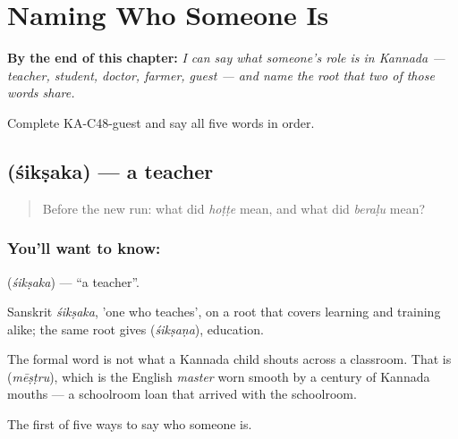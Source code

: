 
\chapter{Naming Who Someone Is}
\label{ch:ka-roles}

\begin{chapteropening}
\textbf{By the end of this chapter:} \emph{I can say what someone's role is in Kannada --- teacher, student, doctor, farmer, guest --- and name the root that two of those words share.}

Complete KA-C48-guest and say all five words in order.
\end{chapteropening}

\section[\texorpdfstring{\kn{ಶಿಕ್ಷಕ} (śikṣaka)}{ಶಿಕ್ಷಕ (śikṣaka)}]{ (śikṣaka) — a teacher}

\label{lesson:KA-C48-teacher}



\begin{quote}
Before the new run: what did \emph{hoṭṭe} mean, and what did \emph{beraḷu} mean?
\end{quote}

\subsection*{You'll want to know: }
\textbf{} (\emph{śikṣaka}) — \textquotedblleft{}a teacher\textquotedblright{}.

Sanskrit \emph{śikṣaka}, 'one who teaches', on a root that covers learning and training alike; the same root gives  (\emph{śikṣaṇa}), education.

The formal word is not what a Kannada child shouts across a classroom. That is  (\emph{mēṣṭru}), which is the English \emph{master} worn smooth by a century of Kannada mouths — a schoolroom loan that arrived with the schoolroom.

\begin{grammarlens}[title={What you've built}]
The first of five ways to say who someone is.
\end{grammarlens}


